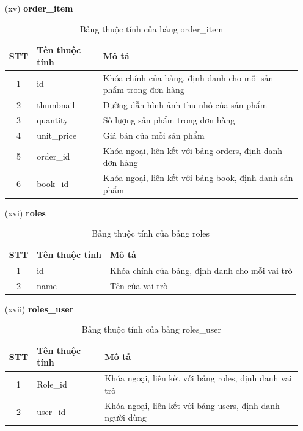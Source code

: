 \documentclass[../DoAn.tex]{subfiles}
\begin{document}
\begin{enumerate}
    \item[(xv)] \textbf{order\_item}
    \begin{table}[H]
    \centering
        \begin{tabular}{|c|m{4cm}|m{8cm}|}
        \hline
        \textbf{STT} & \textbf{Tên thuộc tính} & \textbf{Mô tả} \\
        \hline
        1 & id & Khóa chính của bảng, định danh cho mỗi sản phẩm trong đơn hàng \\
        \hline
        2 & thumbnail & Đường dẫn hình ảnh thu nhỏ của sản phẩm \\
        \hline
        3 & quantity & Số lượng sản phẩm trong đơn hàng \\
        \hline
        4 & unit\_price & Giá bán của mỗi sản phẩm \\
        \hline
        5 & order\_id & Khóa ngoại, liên kết với bảng orders, định danh đơn hàng \\
        \hline
        6 & book\_id & Khóa ngoại, liên kết với bảng book, định danh sản phẩm \\
        \hline
        \end{tabular}
        \caption{Bảng thuộc tính của bảng order\_item}
        \label{tab:order_item_attributes}
    \end{table}

    \item[(xvi)] \textbf{roles}
    \begin{table}[H]
    \centering
        \begin{tabular}{|c|m{4cm}|m{8cm}|}
        \hline
        \textbf{STT} & \textbf{Tên thuộc tính} & \textbf{Mô tả} \\
        \hline
        1 & id & Khóa chính của bảng, định danh cho mỗi vai trò \\
        \hline
        2 & name & Tên của vai trò \\
        \hline
        \end{tabular}
        \caption{Bảng thuộc tính của bảng roles}
        \label{tab:roles_attributes}
    \end{table}

     \item[(xvii)] \textbf{roles\_user}
    \begin{table}[H]
    \centering
        \begin{tabular}{|c|m{4cm}|m{8cm}|}
        \hline
        \textbf{STT} & \textbf{Tên thuộc tính} & \textbf{Mô tả} \\
        \hline
        1 & Role\_id & Khóa ngoại, liên kết với bảng roles, định danh vai trò \\
        \hline
        2 & user\_id & Khóa ngoại, liên kết với bảng users, định danh người dùng \\
        \hline
        \end{tabular}
        \caption{Bảng thuộc tính của bảng roles\_user}
        \label{tab:roles_user_attributes}
    \end{table}


\end{enumerate}
\end{document}
